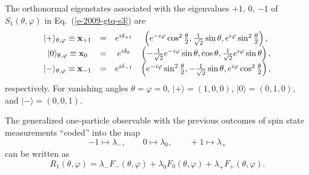 \documentclass[pra,amsfonts,showpacs,showkeys,preprint]{revtex4}
\begin{document}
The orthonormal eigenstates associated with the eigenvalues $+1$, $0$, $-1$ of
$S_1(\theta , \varphi )$ in Eq.~(\ref{e-2009-gtq-s3})
are
\begin{equation}
\label{l-soksp-ev}
\begin{array}{cccccccc}
\vert +\rangle_{\theta ,\varphi} \equiv {\bf x}_{+1}&=&e^{i\delta_{+1}}& \left(
e^{-i\varphi} \cos^2{\theta \over 2}, {1\over \sqrt{2}}   \sin \theta ,e^{i\varphi}  \sin^2{\theta \over 2}
\right),\\
\vert 0\rangle_{\theta ,\varphi} \equiv {\bf x}_{0}&=&e^{i\delta_0}& \left(
-{1\over \sqrt{2}} e^{-i\varphi} \sin \theta , \cos \theta , {1\over \sqrt{2}} e^{i\varphi}\sin \theta
\right),\\
\vert -\rangle_{\theta ,\varphi} \equiv {\bf x}_{-1}&=&e^{i\delta_{-1}}& \left(
e^{-i\varphi} \sin^2{\theta \over 2}, - {1\over \sqrt{2}}     \sin \theta , e^{i\varphi}\cos^2{\theta \over 2}
\right) ,
\end{array}
\end{equation}
respectively.
For vanishing angles $\theta =\varphi =0$,
$\vert +\rangle = (1,0,0)$,
$\vert 0\rangle = (0,1,0)$, and
$\vert -\rangle = (0,0,1)$.


The generalized one-particle observable with the previous outcomes of spin state measurements ``coded''
into the map
\begin{equation}
\label{2009-gtq-c1}
-1 \mapsto  \lambda_{-} ,\qquad
0 \mapsto   \lambda_{0}   ,\qquad
+1 \mapsto   \lambda_{+}
\end{equation}
can be written as
\begin{equation}
\label{2009-gtq-sso1}
R_1(\theta ,\varphi) = \lambda_{-} F_{-}(\theta ,\varphi) + \lambda_{0} F_0(\theta ,\varphi) +  \lambda_{+} F_{+}(\theta ,\varphi)
.
\end{equation}
\end{document}
